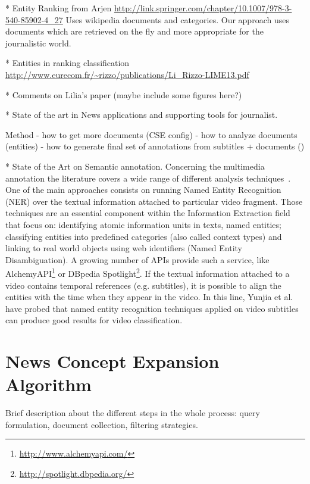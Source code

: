 \documentclass{llncs}
\begin{document}
* Entity Ranking from Arjen
\url{http://link.springer.com/chapter/10.1007/978-3-540-85902-4_27}
Uses wikipedia documents and categories. Our approach uses documents which are retrieved on the fly and more appropriate for the journalistic world.

* Entities in ranking classification
\url{http://www.eurecom.fr/~rizzo/publications/Li_Rizzo-LIME13.pdf}

* Comments on Lilia's paper (maybe include some figures here?)

* State of the art in News applications and supporting tools for journalist.


Method
- how to get more documents (CSE config)
- how to analyze documents (entities)
- how to generate final set of annotations from subtitles + documents ()


* State of the Art on Semantic annotation.
Concerning the multimedia annotation the literature covers a wide range of different analysis techniques~\cite{ballan2011event}. One of the main approaches consists on running Named Entity Recognition (NER) over the textual information attached to particular video fragment. Those techniques are an essential component within the Information Extraction field that focus on: identifying atomic information units in texts, named entities; classifying entities into predefined categories (also called context types) and linking to real world objects using web identifiers (Named Entity Disambiguation). A growing number of APIs provide such a service, like AlchemyAPI\footnote{\fontsize{8pt}{1em}\selectfont \url{http://www.alchemyapi.com/}} or DBpedia Spotlight\footnote{\fontsize{8pt}{1em}\selectfont \url{http://spotlight.dbpedia.org/}}. If the textual information attached to a video contains temporal references (e.g. subtitles), it is possible to align the entities with the time when they appear in the video. In this line, Yunjia et al.~\cite{yunjia2013} have probed that named entity recognition techniques applied on video subtitles can produce good results for video classification.


\section{News Concept Expansion Algorithm}
\label{sec:ConceptExpansion}
Brief description about the different steps in the whole process: query formulation, document collection, filtering strategies.
\end{document}
